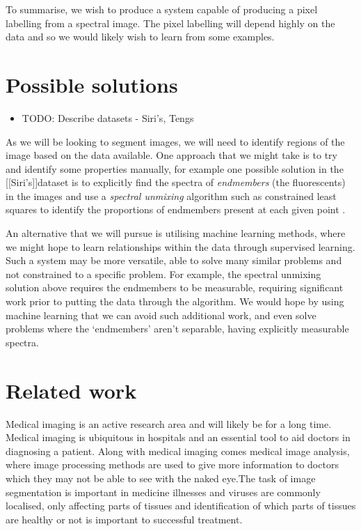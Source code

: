 \documentclass[12pt,twoside,notitlepage]{report}
\newcommand{\siris}{[[Siri's]]}
\begin{document}
        To summarise, we wish to produce a system capable of producing a pixel labelling from a spectral image. The 
        pixel labelling will depend highly on the data and so we would likely wish to learn from some examples.

    \section{Possible solutions}
        \begin{itemize}
            \item TODO: Describe datasets - Siri's, Tengs
        \end{itemize}

        As we will be looking to segment images, we will need to identify regions of the image based on the data 
        available. One approach that we might take is to try and identify some properties manually, for example one 
        possible solution in the \siris dataset is to explicitly find the spectra of \textit{endmembers} (the 
        fluorescents) in the images and use a \textit{spectral unmixing} algorithm \cite{keshava2003survey} such as 
        constrained least squares to identify the proportions of endmembers present at each given point 
        \cite{Luthman:2015:hyperspectralImager}.

        An alternative that we will pursue is utilising machine learning methods, where we might hope to learn 
        relationships within the data through supervised learning. Such a system may be more versatile, able to 
        solve many similar problems and not constrained to a specific problem. For example, the spectral unmixing 
        solution above requires the endmembers to be measurable, requiring significant work prior to putting the data 
        through the algorithm. We would hope by using machine learning that we can avoid such additional work, and even 
        solve problems where the `endmembers' aren't separable, having explicitly measurable spectra.

    \section{Related work}
        Medical imaging is an active research area and will likely be for a long time. Medical imaging is ubiquitous in 
        hospitals and an essential tool to aid doctors in diagnosing a patient. Along with medical imaging comes 
        medical image analysis, where image processing methods are used to give more information to doctors which they 
        may not be able to see with the naked eye.The task of image segmentation is important in medicine illnesses and 
        viruses are commonly localised, only affecting parts of tissues and identification of which parts of tissues 
        are healthy or not is important to successful treatment.
\end{document}
